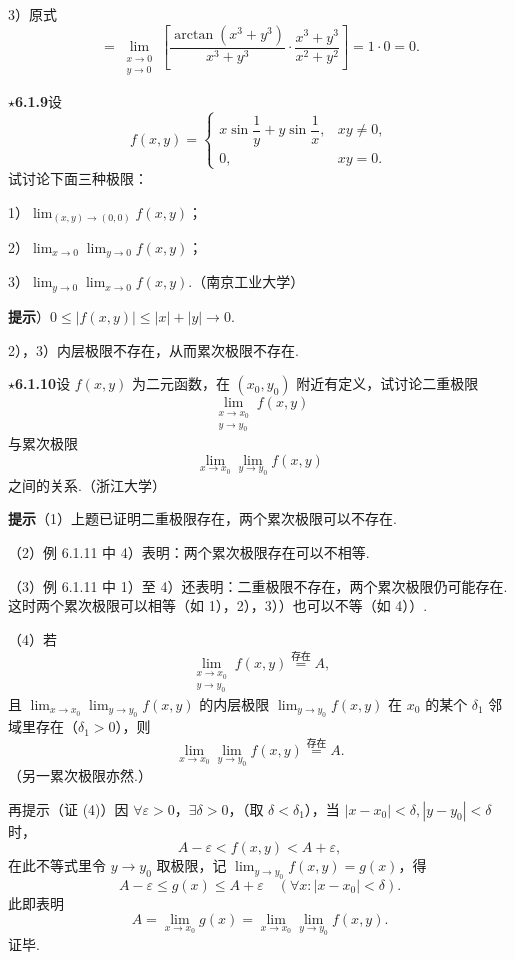\documentclass[UTF8,12pt,a4paper,fontset=fandol]{ctexart}
\begin{document}
3）原式
\[
  =\lim_{\substack{x\to0\\ y\to0}}
  \left[
  \frac{\arctan(x^3+y^3)}{x^3+y^3}\cdot
  \frac{x^3+y^3}{x^2+y^2}
  \right]=1\cdot0=0.
\]

\noindent\textbf{$\star$6.1.9}\quad 设
\[
f(x,y)=
\begin{cases}
x\sin\dfrac1y+y\sin\dfrac1x, & xy\ne0,\\
0, & xy=0.
\end{cases}
\]
试讨论下面三种极限：

1）$\displaystyle\lim_{(x,y)\to(0,0)}f(x,y)$；

2）$\displaystyle\lim_{x\to0}\lim_{y\to0}f(x,y)$；

3）$\displaystyle\lim_{y\to0}\lim_{x\to0}f(x,y)$.（南京工业大学）

\noindent\textbf{提示}）$0\le |f(x,y)|\le |x|+|y|\to0$.

2），3）内层极限不存在，从而累次极限不存在.

\noindent\textbf{$\star$6.1.10}\quad 设 $f(x,y)$ 为二元函数，在 $(x_0,y_0)$ 附近有定义，试讨论二重极限
\[
  \lim_{\substack{x\to x_0\\ y\to y_0}}f(x,y)
\]
与累次极限
\[
  \lim_{x\to x_0}\lim_{y\to y_0}f(x,y)
\]
之间的关系.（浙江大学）

\noindent\textbf{提示}\quad （1）上题已证明二重极限存在，两个累次极限可以不存在.

（2）例 6.1.11 中 4）表明：两个累次极限存在可以不相等.

（3）例 6.1.11 中 1）至 4）还表明：二重极限不存在，两个累次极限仍可能存在. 这时两个累次极限可以相等（如 1），2），3））也可以不等（如 4））.

（4）若
\[
  \lim_{\substack{x\to x_0\\ y\to y_0}}f(x,y)\stackrel{\text{存在}}{=}A,
\]
且 $\displaystyle\lim_{x\to x_0}\lim_{y\to y_0}f(x,y)$ 的内层极限 $\displaystyle\lim_{y\to y_0}f(x,y)$ 在 $x_0$ 的某个 $\delta_1$ 邻域里存在（$\delta_1>0$），则
\[
  \lim_{x\to x_0}\lim_{y\to y_0}f(x,y)\stackrel{\text{存在}}{=}A.
\]
（另一累次极限亦然.）

再提示\quad （证 (4)）因 $\forall\varepsilon>0$，$\exists\delta>0$，（取 $\delta<\delta_1$），当 $|x-x_0|<\delta,|y-y_0|<\delta$ 时，
\[
  A-\varepsilon<f(x,y)<A+\varepsilon,
\]
在此不等式里令 $y\to y_0$ 取极限，记 $\displaystyle\lim_{y\to y_0}f(x,y)=g(x)$，得
\[
  A-\varepsilon\le g(x)\le A+\varepsilon\quad(\forall x:|x-x_0|<\delta).
\]
此即表明
\[
  A=\lim_{x\to x_0}g(x)
  =\lim_{x\to x_0}\lim_{y\to y_0}f(x,y).
\]
证毕.
\end{document}
